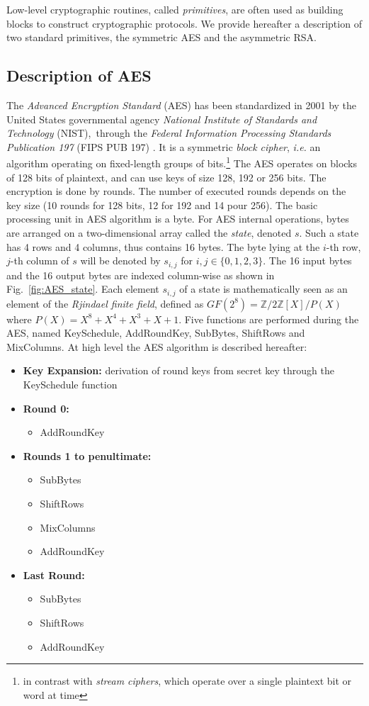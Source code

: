 Low-level cryptographic routines, called \emph{primitives}, are often used as building blocks to construct cryptographic protocols. We provide hereafter a description of two standard primitives, the symmetric AES and the asymmetric RSA.

\subsection{Description of AES}
The \emph{Advanced Encryption Standard} (AES) has been standardized in 2001 by the United States governmental agency \emph{National Institute of Standards and Technology} (NIST),\ through the \emph{Federal Information
Processing Standards Publication 197 } (FIPS PUB 197) \cite{nist197}. It is a symmetric \emph{block cipher}, \emph{i.e.} an algorithm operating on fixed-length groups of bits.\footnote{in contrast with \emph{stream ciphers}, which operate over a single plaintext bit or word at time} The AES operates on blocks of 128 bits of plaintext, and can use keys of size 128, 192 or 256 bits. The encryption is done by rounds. The number of executed rounds depends on the key size (10 rounds for 128 bits, 12 for 192 and 14 pour 256). The basic processing unit in AES algorithm is a byte. For AES internal operations, bytes are arranged on a two-dimensional array called the \emph{state}, denoted $s$. Such a state has 4 rows and 4 columns, thus contains 16 bytes. The byte lying at the $i$-th row, $j$-th column of $s$ will be denoted by $s_{i,j}$ for $i,j\in\{0,1,2,3\}$. The 16 input bytes and the 16 output bytes are indexed column-wise as shown in Fig.~\ref{fig:AES_state}. Each element $s_{i,j}$ of a state is mathematically seen as an element of the \emph{Rjindael finite field}, defined as $GF(2^8) = \mathbb{Z}/{2\mathbb{Z}[X]}/P(X)$ where $P(X) = X^8 + X^4 + X^3 + X + 1$. Five functions are performed during the AES, named KeySchedule, AddRoundKey, SubBytes, ShiftRows and MixColumns. At high level the AES algorithm is described hereafter:
\begin{itemize}
\item[]\textbf{Key Expansion:}  derivation of round keys from secret key through the KeySchedule function
\item[]\textbf{Round 0:}  
\begin{itemize}
\item[] AddRoundKey
\end{itemize}
\item[] \textbf{Rounds 1 to penultimate:}
\begin{itemize}
\item[] SubBytes
\item[] ShiftRows
\item[] MixColumns
\item[] AddRoundKey
\end{itemize}
\item[] \textbf{Last Round:}
\begin{itemize}
\item[] SubBytes
\item[] ShiftRows
\item[] AddRoundKey
\end{itemize}
\end{itemize}

